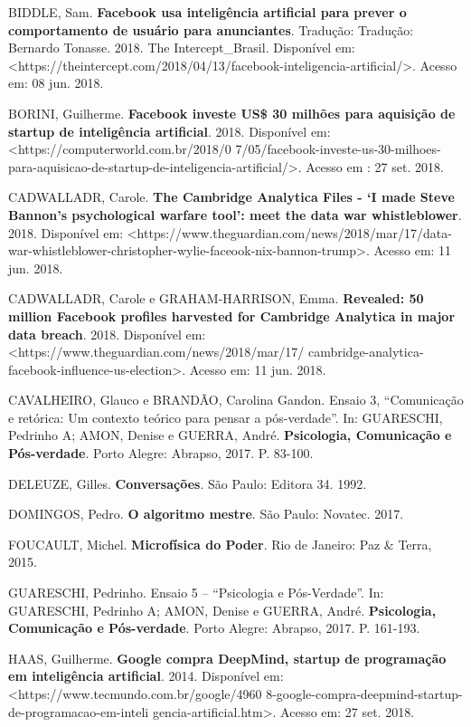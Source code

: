 BIDDLE, Sam. \textbf{Facebook usa inteligência artificial para prever o
comportamento de usuário para anunciantes}. Tradução: Tradução: Bernardo
Tonasse. 2018. The Intercept\_Brasil. Disponível em:
\textless{}https://theintercept.com/2018/04/13/facebook-inteligencia-artificial/\textgreater{}.
Acesso em: 08 jun. 2018.

BORINI, Guilherme. \textbf{Facebook investe US\$ 30 milhões para
aquisição de startup de inteligência artificial}. 2018. Disponível em:
\textless{}https://computerworld.com.br/2018/0
7/05/facebook-investe-us-30-milhoes-para-aquisicao-de-startup-de-inteligencia-artificial/\textgreater{}.
Acesso em : 27 set. 2018.

CADWALLADR, Carole. \textbf{The Cambridge Analytica Files - `I made
Steve Bannon's psychological warfare tool': meet the data war
whistleblower}. 2018. Disponível em:
\textless{}https://www.theguardian.com/news/2018/mar/17/data-war-whistleblower-christopher-wylie-faceook-nix-bannon-trump\textgreater{}.
Acesso em: 11 jun. 2018.

CADWALLADR, Carole e GRAHAM-HARRISON, Emma. \textbf{Revealed: 50 million
Facebook profiles harvested for Cambridge Analytica in major data
breach}. 2018. Disponível em:
\textless{}https://www.theguardian.com/news/2018/mar/17/
cambridge-analytica-facebook-influence-us-election\textgreater{}.
Acesso em: 11 jun. 2018.

CAVALHEIRO, Glauco e BRANDÃO, Carolina Gandon. Ensaio 3, ``Comunicação e
retórica: Um contexto teórico para pensar a pós-verdade''. In:
GUARESCHI, Pedrinho A; AMON, Denise e GUERRA, André. \textbf{Psicologia,
Comunicação e Pós-verdade}. Porto Alegre: Abrapso, 2017. P. 83-100.

DELEUZE, Gilles. \textbf{Conversações}. São Paulo: Editora 34. 1992.

DOMINGOS, Pedro. \textbf{O algoritmo mestre}. São Paulo: Novatec. 2017.

FOUCAULT, Michel. \textbf{Microfísica do Poder}. Rio de Janeiro: Paz \&
Terra, 2015.

GUARESCHI, Pedrinho. Ensaio 5 -- ``Psicologia e Pós-Verdade''. In:
GUARESCHI, Pedrinho A; AMON, Denise e GUERRA, André. \textbf{Psicologia,
Comunicação e Pós-verdade}. Porto Alegre: Abrapso, 2017. P. 161-193.

HAAS, Guilherme. \textbf{Google compra DeepMind, startup de programação
em inteligência artificial}. 2014. Disponível em:
\textless{}https://www.tecmundo.com.br/google/4960
8-google-compra-deepmind-startup-de-programacao-em-inteli
gencia-artificial.htm\textgreater{}.
Acesso em: 27 set. 2018.

